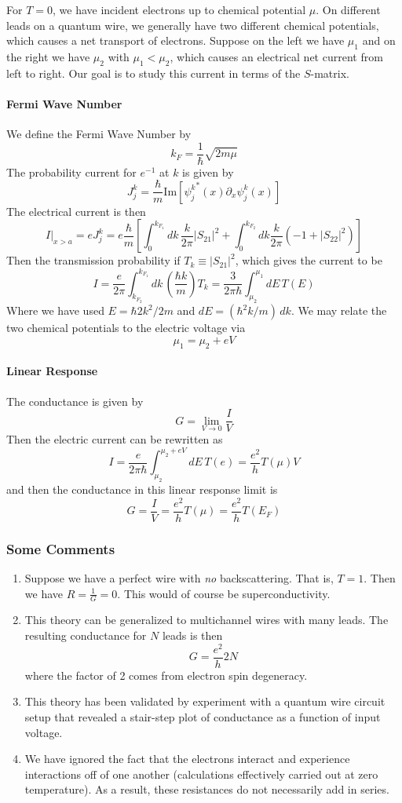 \documentclass{article}
\begin{document}
			\noindent For $T=0$, we have incident electrons up to chemical potential $\mu$. On different leads on a quantum wire, we generally have two different chemical potentials, which causes a net transport of electrons. Suppose on the left we have $\mu_1$ and on the right we have $\mu_2$ with $\mu_1<\mu_2$, which causes an electrical net current from left to right. Our goal is to study this current in terms of the $S$-matrix.
			\paragraph{Fermi Wave Number} We define the Fermi Wave Number by
			$$k_F=\frac{1}{\hbar}\sqrt{2m\mu}$$
			The probability current for $e^{-1}$ at $k$ is given by
			$$J_j^k=\frac{\hbar}{m}\mathrm{Im}\left[{\psi_j^k}^*(x)\partial_x \psi_j^k(x)\right]$$
			The electrical current is then
			$$\left.I\right|_{x>a}=e J_j^k=e\frac{\hbar}{m}\left[\int_0^{k_{F_1}}dk\,\frac{k}{2\pi}\left|S_{21}\right|^2+\int_{0}^{k_{F_2}}dk\frac{k}{2\pi}\left(-1+\left|S_{22}\right|^2\right)\right]$$
			Then the transmission probability if $T_k\equiv\left|S_{21}\right|^2$, which gives the current to be
			$$I=\frac{e}{2\pi}\int_{k_{F_2}}^{k_{F_1}}dk\,\left(\frac{\hbar k}{m}\right)T_k=\frac{3}{2\pi\hbar}\int_{\mu_2}^{\mu_1} dE\,T(E)$$
			Where we have used $E=\hbar2k^2/2m$ and $dE=(\hbar^2k/m)\,dk$. We may relate the two chemical potentials to the electric voltage via
			$$\mu_1=\mu_2+eV$$
			\paragraph{Linear Response}
			The conductance is given by 
			$$G=\lim_{V\to0} \frac{I}{V}$$
			Then the electric current can be rewritten as
			$$I=\frac{e}{2\pi\hbar}\int_{\mu_2}^{\mu_2+eV}dE\,T(e)=\frac{e^2}{h}T(\mu)V$$
			and then the conductance in this linear response limit is
			$$G=\frac{I}{V}=\frac{e^2}{h}T(\mu)=\frac{e^2}{h}T(E_F)$$
			\subsubsection{Some Comments}
			\begin{enumerate}
				\item Suppose we have a perfect wire with \emph{no} backscattering. That is, $T=1$. Then we have $R=\frac{1}{G}=0$. This would of course be superconductivity.
				\item This theory can be generalized to multichannel wires with many leads. The resulting conductance for $N$ leads is then
				$$G=\frac{e^2}{h}2N$$
				where the factor of 2 comes from electron spin degeneracy.
				\item This theory has been validated by experiment with a quantum wire circuit setup that revealed a stair-step plot of conductance as a function of input voltage.
				\item We have ignored the fact that the electrons interact and experience interactions off of one another (calculations effectively carried out at zero temperature). As a result, these resistances do not necessarily add in series.
			\end{enumerate}
\end{document}
